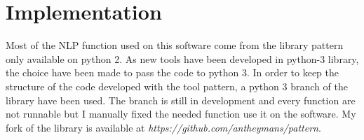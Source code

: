 \documentclass[a4paper, 12pt]{report}
\begin{document}
\begin{table}
\center
{}
\caption{}\label{Novels and script whose social network has been extracted. `Pride and prejudice' has been used under the form of the novel and under the form of the adaptation's script. In total there is 46 novels and 25 scripts.}
\end{table}

\section{Implementation}

Most of the NLP function used on this software come from the library pattern \citep{pattern} only available on python 2. As new tools have been developed in python-3 library, the choice have been made to pass the code to python 3. 
In order to keep the structure of the code developed with the tool pattern, a python 3 branch of the library have been used. The branch is still in development and every function are not runnable but I manually fixed the needed function use it on the software.  My fork of the library is available at \textit{https://github.com/antheymans/pattern}.\\
\end{document}
